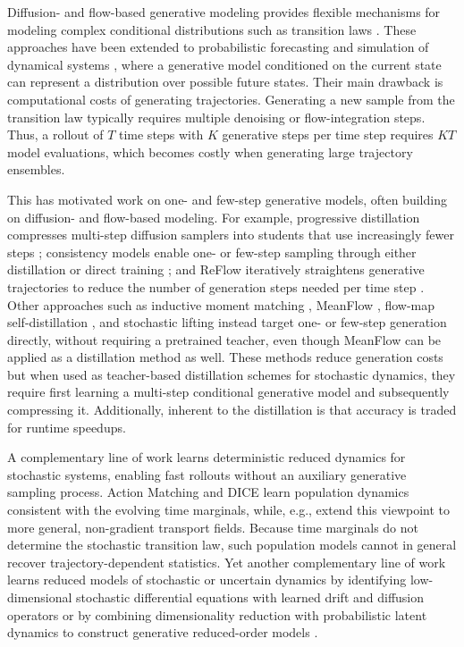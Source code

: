 \documentclass[oneside,11pt]{article}
\theoremstyle{remark}
\begin{document}
Diffusion- and flow-based generative modeling provides flexible mechanisms for modeling complex conditional distributions such as transition laws  \cite{sohldickstein2015deep,ho2020denoising,song2021score,pmlr-v180-shi22a,lipman2023flow,tong2024conditional,albergo2025stochastic}. These approaches have been extended to probabilistic forecasting and simulation of dynamical systems \cite{chen2024probforecast,cachay2023dyffusion,KOHL2026108641}, where a generative model conditioned on the current state can represent a distribution over possible future states. Their main drawback is computational costs of generating trajectories. Generating a new sample from the transition law typically requires multiple denoising or flow-integration steps. Thus, a rollout of $T$ time steps with $K$ generative steps per time step requires $KT$ model evaluations, which becomes costly when generating large trajectory ensembles.

This has motivated work on one- and few-step generative models, often building on diffusion- and flow-based modeling. For example, progressive distillation compresses multi-step diffusion samplers into students that use increasingly fewer steps \cite{salimans2022progressive}; consistency models enable one- or few-step sampling through either distillation or direct training \cite{song2023consistency}; and ReFlow iteratively straightens generative trajectories to reduce the number of generation steps needed per time step \cite{liu2023rectified}. Other approaches such as inductive moment matching \cite{zhou2025imm}, MeanFlow \cite{geng2025mean}, flow-map self-distillation \cite{boffi2025how}, and stochastic lifting \cite{berman2026stochastic} instead target one- or few-step generation directly, without requiring a pretrained teacher, even though MeanFlow can be applied as a distillation method as well. These methods reduce generation costs but when used as teacher-based distillation schemes for stochastic dynamics, they require first learning a multi-step conditional generative model and subsequently compressing it. Additionally, inherent to the distillation is that accuracy is traded for runtime speedups. 

A complementary line of work learns deterministic reduced dynamics for stochastic systems, enabling fast rollouts without an auxiliary generative sampling process. Action Matching \cite{neklyudov2023action,berman2024parametric} and DICE \cite{blickhan-berman-stuart-etal:2025} learn population dynamics consistent with the evolving time marginals, while, e.g.,  \cite{schwerdtner2026twoparameter,berman2026ngif} extend this viewpoint to more general, non-gradient transport fields. Because time marginals do not determine the stochastic transition law, such population models cannot in general recover trajectory-dependent statistics. Yet another complementary line of work learns reduced models of stochastic or uncertain dynamics by identifying low-dimensional stochastic differential equations with learned drift and diffusion operators \cite{freitag2025learning} or by combining dimensionality reduction with probabilistic latent dynamics to construct generative reduced-order models \cite{conti2026veni}.
\end{document}
